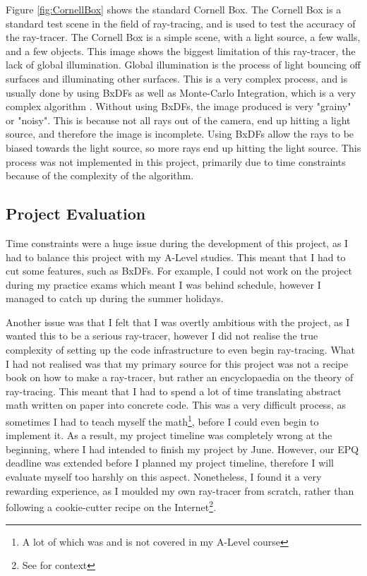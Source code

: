 \documentclass[../main.tex]{subfiles}
\begin{document}
Figure \ref{fig:CornellBox} shows the standard Cornell Box.
The Cornell Box is a standard test scene in the field of ray-tracing, and is used to test the 
accuracy of the ray-tracer. The Cornell Box is a simple scene, with a light source, a few walls, and a few objects.
This image shows the biggest limitation of this ray-tracer, the lack of global illumination. Global illumination is the
process of light bouncing off surfaces and illuminating other surfaces. This is a very complex process, and is usually
done by using BxDFs as well as Monte-Carlo Integration, which is a very complex algorithm \cite{higham_accuracy_2002}.
Without using BxDFs, the image produced is very "grainy" or "noisy". This is because not all rays out of the camera,
end up hitting a light source, and therefore the image is incomplete. Using BxDFs allow the rays to be biased towards the 
light source, so more rays end up hitting the light source.
This process was not implemented in this project, primarily due to time constraints because of the complexity of the algorithm.

\subsection{Project Evaluation}
Time constraints were a huge issue during the development of this project, 
as I had to balance this project with my A-Level studies. This meant that I had to cut some features, such as BxDFs.
For example, I could not work on the project during my practice exams which meant I was behind schedule, however
I managed to catch up during the summer holidays.

Another issue was that I felt that I was overtly ambitious with the project, as I wanted this to 
be a serious ray-tracer, however I did not realise the true complexity of 
setting up the code infrastructure to even begin ray-tracing. What I had not realised was
that my primary source for this project was not a recipe book on how to make a ray-tracer,
but rather an encyclopaedia on the theory of ray-tracing. This meant that I had to spend a lot of time
translating abstract math written on paper into concrete code. This was a very difficult process, as 
sometimes I had to teach myself the math\footnote{A lot of which was and is not covered in my A-Level course}, 
before I could even begin to implement it. As a result, my project timeline was completely wrong at the beginning, where I had 
intended to finish my project by June. However, our EPQ deadline was extended before I planned my project timeline, therefore I will 
evaluate myself too harshly on this aspect. Nonetheless, I found it a very rewarding experience, as I
moulded my own ray-tracer from scratch, rather than following a cookie-cutter recipe on the Internet\footnote{See \cite{noauthor_how_nodate} 
for context}.
\end{document}

